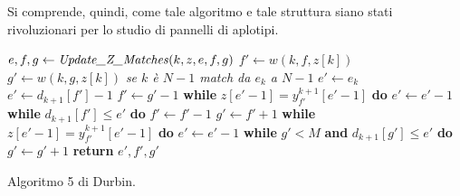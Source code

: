 Si comprende, quindi, come tale algoritmo e tale struttura siano stati
rivoluzionari per lo studio di pannelli di aplotipi.
\begin{algorithm}
  \begin{algorithmic}[1]   
    \State $e,f,g\gets \mbox{\textit{Update\_Z\_Matches}}(k, z, e, f, g)$
    \EndFor
    \EndFunction
    \State
    \State $f'\gets w(k, f, z[k])$
    \State $g'\gets w(k, g, z[k])$
    \Comment\textit{{se $k$ è $N-1$ match da $e_k$ a $N-1$}}
    \State $e'\gets e_k$
    \Else
    \State $e'\gets d_{k+1}[f']-1$
    \State $f'\gets g'-1$
    \State \textbf{while} $z[e'-1]=y_{f'}^{k+1}[e'-1]$ \textbf{do} $e'\gets
    e'-1$
    \State \textbf{while} $d_{k+1}[f']\leq e'$ \textbf{do} $f'\gets f'-1$
    \Else
    \State $g'\gets f'+1$
    \State \textbf{while} $z[e'-1]=y_{f'}^{k+1}[e'-1]$ \textbf{do}  $e'\gets
    e'-1$ 
    \State \textbf{while} $g'<M$ \textbf{and} $d_{k+1}[g']\leq e'$ \textbf{do}
    $g'\gets g'+1$ 
    \EndIf
    \EndIf
    \State \textbf{return} $e',f',g'$
    \EndFunction
  \end{algorithmic}
  \caption{Algoritmo 5 di Durbin.}
  \label{algo:dur5}
\end{algorithm}
